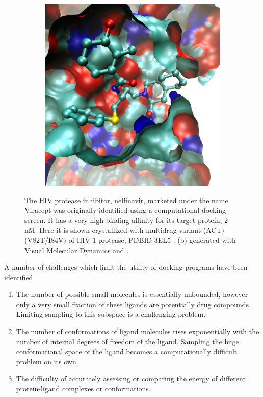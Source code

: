 \begin{figure}[h]
\begin{subfigure}[b]{0.3\textwidth}
        \includegraphics[width=\textwidth]{figures/complexed_nelfinavir_white.png}
        \label{fig:nelfinavir_docked}
        \caption{}
    \end{subfigure}
    \label{fig:nelfinavir}
    \caption{
The HIV protease inhibitor, nelfinavir, marketed under the name Viracept was originally identified using a computational docking screen.
It has a very high binding affinity for its target protein, 2 nM.
Here it is shown crystallized with multidrug variant (ACT) (V82T/I84V) of HIV-1 protease, PDBID 3EL5 \protect\cite{king2012extreme}.
(b) generated with Visual Molecular Dynamics \protect\cite{humphrey1996vmd} and \protect\cite{povray}.
}
\end{figure}
A number of challenges which limit the utility of docking programs have been identified
\begin{enumerate}
\item The number of possible small molecules is essentially unbounded, however only a very small fraction of these ligands are potentially drug compounds. Limiting sampling to this subspace is a challenging problem.
\item The number of conformations of ligand molecules rises exponentially with the number of internal degrees of freedom of the ligand. Sampling the huge conformational space of the ligand becomes a computationally difficult problem on its own.
\item The difficulty of accurately assessing or comparing the energy of different protein-ligand complexes or conformations\cite{shoichet2004virtual}.
\end{enumerate}

